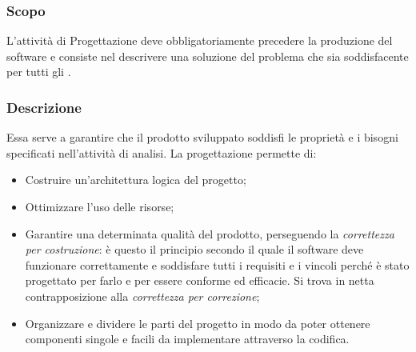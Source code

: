 \documentclass[../NomeDocumento.tex]{subfiles}
\begin{document}
	\subsubsection{Scopo} 

	L'attività di Progettazione deve obbligatoriamente precedere la produzione del software e consiste nel descrivere una soluzione del problema che sia soddisfacente per tutti gli .
	
	\subsubsection{Descrizione}
	
	Essa serve a garantire che il prodotto sviluppato soddisfi le proprietà e i bisogni specificati nell'attività di analisi. La progettazione permette di:
	
	\begin{itemize}
		\item Costruire un’architettura logica del progetto;
		\item Ottimizzare l’uso delle risorse;
		\item Garantire una determinata qualità del prodotto, perseguendo la \textit{correttezza per costruzione}: è questo il principio secondo il quale il software deve funzionare correttamente e soddisfare tutti i requisiti e i vincoli perché è stato progettato per farlo e per essere conforme ed efficacie. Si trova in netta contrapposizione alla \textit{correttezza per
		correzione};
		\item Organizzare e dividere le parti del progetto in modo da poter ottenere componenti singole e facili da implementare attraverso la codifica. 
	\end{itemize}
\end{document}
